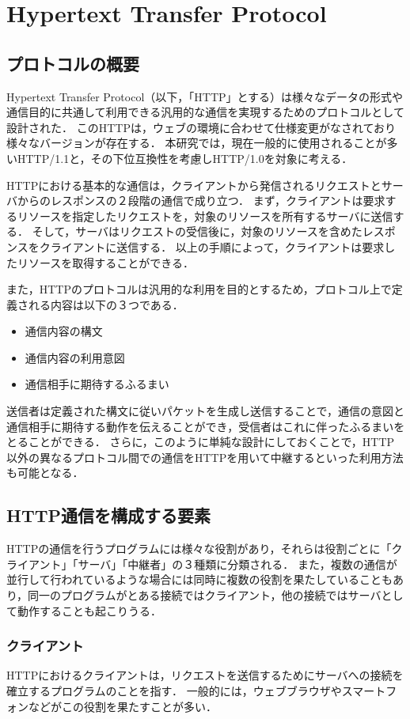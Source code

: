 \documentclass[12pt,a4paper]{jbook}
\begin{document}
\section{Hypertext Transfer Protocol}
\label{sec:http}
\subsection{プロトコルの概要}
Hypertext Transfer Protocol（以下，「HTTP」とする）は様々なデータの形式や通信目的に共通して利用できる汎用的な通信を実現するためのプロトコルとして設計された．
このHTTPは，ウェブの環境に合わせて仕様変更がなされており様々なバージョンが存在する．
本研究では，現在一般的に使用されることが多いHTTP/1.1\cite{rfc7230,rfc7231,rfc7232,rfc7233,rfc7234,rfc7235}と，その下位互換性を考慮しHTTP/1.0\cite{rfc1945}を対象に考える．

HTTPにおける基本的な通信は，クライアントから発信されるリクエストとサーバからのレスポンスの２段階の通信で成り立つ．
まず，クライアントは要求するリソースを指定したリクエストを，対象のリソースを所有するサーバに送信する．
そして，サーバはリクエストの受信後に，対象のリソースを含めたレスポンスをクライアントに送信する．
以上の手順によって，クライアントは要求したリソースを取得することができる．

また，HTTPのプロトコルは汎用的な利用を目的とするため，プロトコル上で定義される内容は以下の３つである．
\begin{itemize}
\item 通信内容の構文
\item 通信内容の利用意図
\item 通信相手に期待するふるまい
\end{itemize}
送信者は定義された構文に従いパケットを生成し送信することで，通信の意図と通信相手に期待する動作を伝えることができ，受信者はこれに伴ったふるまいをとることができる．
さらに，このように単純な設計にしておくことで，HTTP以外の異なるプロトコル間での通信をHTTPを用いて中継するといった利用方法も可能となる．

\subsection{HTTP通信を構成する要素}
HTTPの通信を行うプログラムには様々な役割があり，それらは役割ごとに「クライアント」「サーバ」「中継者」の３種類に分類される．
また，複数の通信が並行して行われているような場合には同時に複数の役割を果たしていることもあり，同一のプログラムがとある接続ではクライアント，他の接続ではサーバとして動作することも起こりうる．

\subsubsection{クライアント}
HTTPにおけるクライアントは，リクエストを送信するためにサーバへの接続を確立するプログラムのことを指す．
一般的には，ウェブブラウザやスマートフォンなどがこの役割を果たすことが多い．
\end{document}
